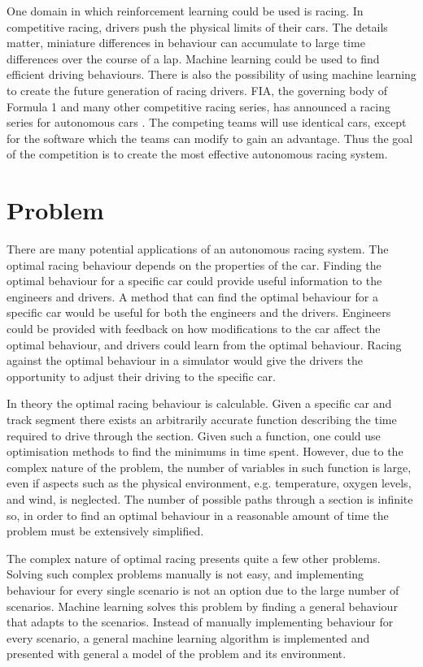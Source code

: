 One domain in which reinforcement learning could be used is racing. In competitive racing, drivers push the physical limits of their cars. The details matter, miniature differences in behaviour can accumulate to large time differences over the course of a lap. Machine learning could be used to find efficient driving behaviours. There is also the possibility of using machine learning to create the future generation of racing drivers. FIA, the governing body of Formula 1 and many other competitive racing series, has announced a racing series for autonomous cars \cite{roborace}. The competing teams will use identical cars, except for the software which the teams can modify to gain an advantage. Thus the goal of the competition is to create the most effective autonomous racing system. 

\section{Problem}
There are many potential applications of an autonomous racing system. The optimal racing behaviour depends on the properties of the car. Finding the optimal behaviour for a specific car could provide useful information to the engineers and drivers. A method that can find the optimal behaviour for a specific car would be useful for both the engineers and the drivers. Engineers could be provided with feedback on how modifications to the car affect the optimal behaviour, and drivers could learn from the optimal behaviour. Racing against the optimal behaviour in a simulator would give the drivers the opportunity to adjust their driving to the specific car.

In theory the optimal racing behaviour is calculable. Given a specific car and track segment there exists an arbitrarily accurate function describing the time required to drive through the section. Given such a function, one could use optimisation methods to find the minimums in time spent. However, due to the complex nature of the problem, the number of variables in such function is large, even if aspects such as the physical environment, e.g. temperature, oxygen levels, and wind, is neglected. The number of possible paths through a section is infinite so, in order to find an optimal behaviour in a reasonable amount of time the problem must be extensively simplified.

The complex nature of optimal racing presents quite a few other problems. Solving such complex problems manually is not easy, and implementing behaviour for every single scenario is not an option due to the large number of scenarios. Machine learning solves this problem by finding a general behaviour that adapts to the scenarios. Instead of manually implementing behaviour for every scenario, a general machine learning algorithm is implemented and presented with general a model of the problem and its environment.

